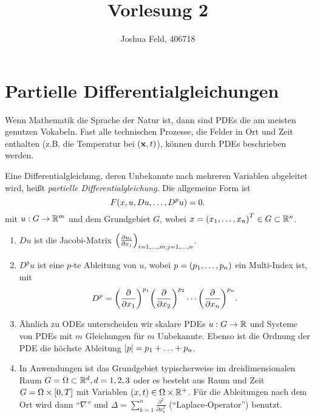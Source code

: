 \documentclass{lecture}
\institute{Applied and Computational Mathematics}
\title{Vorlesung 2}
\author{Joshua Feld, 406718}
\begin{document}
    \maketitle


    \section*{Partielle Differentialgleichungen}

    Wenn Mathematik die Sprache der Natur ist, dann sind PDEs die am meisten genutzen Vokabeln.
    Fast alle technischen Prozesse, die Felder in Ort und Zeit enthalten (z.B. die Temperatur bei \(\parentheses*{\mathbf{x}, t}\)), können durch PDEs beschrieben werden.
    \begin{definition}
        Eine Differentialgleichung, deren Unbekannte nach mehreren Variablen abgeleitet wird, heißt \emph{partielle Differentialgleichung}.
        Die allgemeine Form ist
        \[
            F\parentheses*{x, u, Du, \ldots, D^p u} = 0.
        \]
        mit \(u: G \to \R^m\) und dem Grundgebiet \(G\), wobei \(x = \parentheses*{x_1, \ldots, x_n}^T \in G \subset \R^n\).
    \end{definition}
    \begin{remark}
        \begin{enumerate}
            \item \(Du\) ist die Jacobi-Matrix \(\parentheses*{\frac{\partial u_i}{\partial x_j}}_{i = 1, \ldots, m; j = 1, \ldots, n}\).
            \item \(D^p u\) ist eine \(p\)-te Ableitung von \(u\), wobei \(p = \parentheses*{p_1, \ldots, p_n}\) ein Multi-Index ist, mit
            \[
                D^p = \parentheses*{\frac{\partial}{\partial x_1}}^{p_1}\parentheses*{\frac{\partial}{\partial x_2}}^{p_2}\cdots\parentheses*{\frac{\partial}{\partial x_n}}^{p_n}.
            \]
            \item Ähnlich zu ODEs unterscheiden wir skalare PDEs \(u: G \to \R\) und Systeme von PDEs mit \(m\) Gleichungen für \(m\) Unbekannte.
            Ebenso ist die Ordnung der PDE die höchste Ableitung \(\absolute*{p} = p_1 + \ldots + p_n\).
            \item In Anwendungen ist das Grundgebiet typischerweise im dreidimensionalen Raum \(G = \Omega \subset \R^d, d = 1, 2, 3\) oder es besteht aus Raum und Zeit \(G = \Omega \times \brackets*{0, T}\) mit Variablen \(\parentheses*{x, t} \in \Omega \times \R^+\).
            Für die Ableitungen nach dem Ort wird dann ``\(\nabla\)'' und \(\Delta = \sum_{k = 1}^n \frac{\partial^2}{\partial x_k^2}\) (``Laplace-Operator'') benutzt.
        \end{enumerate}
    \end{remark}
\end{document}
